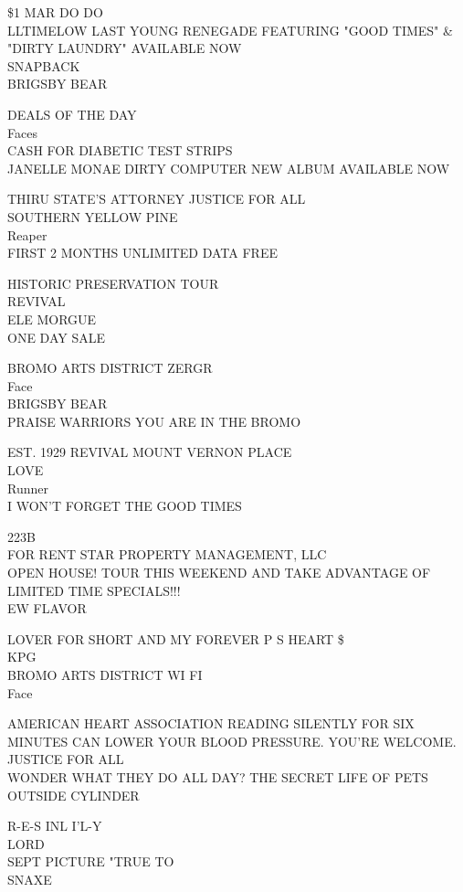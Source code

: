 \documentclass[10pt,letterpaper]{article}
\begin{document}
\$1 MAR DO DO\\
LLTIMELOW LAST YOUNG RENEGADE FEATURING "GOOD TIMES" \& "DIRTY LAUNDRY" AVAILABLE NOW\\
SNAPBACK\\
BRIGSBY BEAR

DEALS OF THE DAY\\
Faces\\
CASH FOR DIABETIC TEST STRIPS\\
JANELLE MONAE DIRTY COMPUTER NEW ALBUM AVAILABLE NOW

THIRU STATE'S ATTORNEY JUSTICE FOR ALL\\
SOUTHERN YELLOW PINE\\
Reaper\\
FIRST 2 MONTHS UNLIMITED DATA FREE

HISTORIC PRESERVATION TOUR\\
REVIVAL\\
ELE MORGUE\\
ONE DAY SALE

BROMO ARTS DISTRICT ZERGR\\
Face\\
BRIGSBY BEAR\\
PRAISE WARRIORS YOU ARE IN THE BROMO

EST. 1929 REVIVAL MOUNT VERNON PLACE\\
LOVE\\
Runner\\
I WON'T FORGET THE GOOD TIMES

223B\\
FOR RENT STAR PROPERTY MANAGEMENT, LLC\\
OPEN HOUSE!  TOUR THIS WEEKEND AND TAKE ADVANTAGE OF LIMITED TIME SPECIALS!!!\\
EW FLAVOR

LOVER FOR SHORT AND MY FOREVER P S HEART \$\\
KPG\\
BROMO ARTS DISTRICT WI FI\\
Face

AMERICAN HEART ASSOCIATION READING SILENTLY FOR SIX MINUTES CAN LOWER YOUR BLOOD PRESSURE.  YOU'RE WELCOME.\\
JUSTICE FOR ALL\\
WONDER WHAT THEY DO ALL DAY?  THE SECRET LIFE OF PETS\\
OUTSIDE CYLINDER

R{-}E{-}S INL I'L{-}Y\\
LORD\\
SEPT PICTURE "TRUE TO\\
SNAXE
\end{document}
